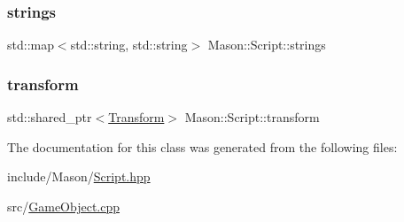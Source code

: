 \subsubsection{\texorpdfstring{strings}{strings}}
{\footnotesize\ttfamily std\+::map$<$std\+::string, std\+::string$>$ Mason\+::\+Script\+::strings}

\hypertarget{class_mason_1_1_script_a480aa8b8f65245d51e41ceeaf9cab93a}{}\label{class_mason_1_1_script_a480aa8b8f65245d51e41ceeaf9cab93a} 
\subsubsection{\texorpdfstring{transform}{transform}}
{\footnotesize\ttfamily std\+::shared\+\_\+ptr$<$\hyperlink{class_mason_1_1_transform}{Transform}$>$ Mason\+::\+Script\+::transform}



The documentation for this class was generated from the following files\+:\begin{DoxyCompactItemize}
\item 
include/\+Mason/\hyperlink{_script_8hpp}{Script.\+hpp}\item 
src/\hyperlink{_game_object_8cpp}{Game\+Object.\+cpp}\end{DoxyCompactItemize}
